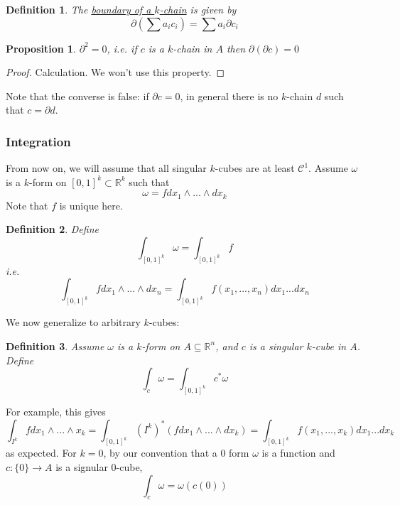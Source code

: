 \documentclass{article}
\newtheorem{definition}{Definition}
\newtheorem{proposition}{Proposition}
\newcommand{\reals}[0]{\mathbb{R}}
\newcommand{\mc}[1]{\mathcal{#1}}
\begin{document}
\begin{definition}
  The \underline{boundary of a \(k\)-chain} is given by
  \begin{equation}
    \partial\left(\sum a_ic_i \right) = \sum a_i\partial c_i
  \end{equation}
\end{definition}
\begin{proposition}
  \(\partial^2 = 0\), i.e. if \(c\) is a \(k\)-chain in \(A\) then \(\partial(\partial c) = 0\)
\end{proposition}
\begin{proof}
  Calculation. We won't use this property.
\end{proof}
Note that the converse is false: if \(\partial c = 0\), in general there is no \(k\)-chain \(d\) such that \(c = \partial d\).

\subsubsection{Integration}

From now on, we will assume that all singular \(k\)-cubes are at least \(\mc{C}^1\). Assume \(\omega\) is a \(k\)-form on \([0, 1]^k \subset \reals^k\) such that
\begin{equation}
  \omega = fdx_1 \wedge ... \wedge dx_k
\end{equation}
Note that \(f\) is unique here.
\begin{definition}
  Define
  \begin{equation}
    \int_{[0, 1]^k}\omega = \int_{[0, 1]^k}f
  \end{equation}
  i.e.
  \begin{equation}
    \int_{[0, 1]^k}f dx_1 \wedge ... \wedge dx_n = \int_{[0, 1]^k}f(x_1,...,x_n)dx_1...dx_n
  \end{equation}
\end{definition}
We now generalize to arbitrary \(k\)-cubes:
\begin{definition}
  Assume \(\omega\) is a \(k\)-form on \(A \subseteq \reals^n\), and \(c\) is a singular \(k\)-cube in \(A\). Define
  \begin{equation}
    \int_c\omega = \int_{[0, 1]^k}c^*\omega
  \end{equation}
\end{definition}
For example, this gives
\begin{equation}
  \int_{I^k}fdx_1 \wedge ... \wedge x_k = \int_{[0, 1]^k}(I^k)^*(f dx_1 \wedge ... \wedge dx_k) = \int_{[0, 1]^k}f(x_1,...,x_k)dx_1...dx_k
\end{equation}
as expected. For \(k = 0\), by our convention that a \(0\) form \(\omega\) is a function and \(c: \{0\} \to A\) is a signular 0-cube,
\begin{equation}
  \int_c\omega = \omega(c(0))
\end{equation}
\end{document}
